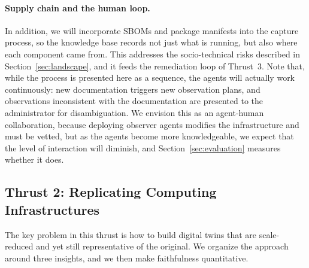 \paragraph{Supply chain and the human loop.}
In addition, we will incorporate SBOMs and package manifests into the capture process, so the
knowledge base records not just what is running, but also where each
component came from. This addresses the socio-technical risks
described in Section~\ref{sec:landscape}, and it feeds the remediation loop
of Thrust~3. Note that, while the process is presented here as a sequence,
the agents will actually work continuously: new documentation triggers new
observation plans, and observations inconsistent with the documentation are
presented to the administrator for disambiguation. We envision this
as an agent-human collaboration, because deploying observer agents modifies
the infrastructure and must be vetted, but as the agents become more
knowledgeable, we expect that the level of interaction will diminish, and
Section~\ref{sec:evaluation} measures whether it does.

\subsection{Thrust 2: Replicating Computing Infrastructures}
\label{sec:thrust2}

The key problem in this thrust is how to build digital twins that are
scale-reduced and yet still representative of the original. We organize the
approach around three insights, and we then make faithfulness quantitative.

